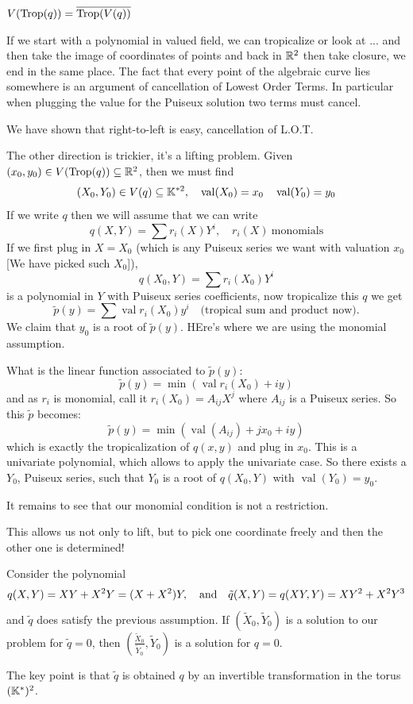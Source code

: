 \documentclass[12pt]{memoir}
\DeclareMathOperator{\val}{val}
\DeclareMathOperator{\Trop}{Trop}
\begin{document}
\begin{Th}
$V(\Trop(q))=\ov{\Trop(V(q))}$
\end{Th}

If we start with a polynomial in valued field, we can tropicalize or look at ... and then take the image of coordinates of points and back in $\mathbb{R}^2$ then take closure, we end in the same place. The fact that every point of the algebraic curve  lies somewhere is an argument of cancellation of Lowest Order Terms. In particular when plugging the value for the Puiseux solution two terms must cancel. 
\begin{ptcbp}
We have shown that right-to-left is easy, cancellation of L.O.T.\par 
The other direction is trickier, it's a lifting problem. Given $(x_0,y_0)\in V(\Trop(q))\subseteq\bR^2$, then we must find 
$$(X_0,Y_0)\in V(q)\subseteq \bK^{\ast2},\quad\val(X_0)=x_0\quad\val(Y_0)=y_0$$
If we write $q$ then we will assume that we can write 
$$q(X,Y)=\sum r_i(X)Y^i,\quad r_i(X)\ \text{monomials}$$
If we first plug in $X=X_0$ (which is any Puiseux series we want with valuation $x_0$ [We have picked such $X_0$]), 
$$q(X_0,Y)=\sum r_i(X_0)Y^i$$
is a polynomial in $Y$ with Puiseux series coefficients, now tropicalize this $q$ we get 
$$\tilde{p}(y)=\sum\val r_i(X_0)y^i\quad\text{(tropical sum and product now)}.$$
We claim that $y_0$ is a root of $\tilde{p}(y)$. HEre's where we are using the monomial assumption.\par 
What is the linear function associated to $\tilde{p}(y)$:
$$\tilde{p}(y)=\min(\val r_i(X_0)+iy)$$
and as $r_i$ is monomial, call it $r_i(X_0)=A_{ij}X^j$ where $A_{ij}$ is a Puiseux series. So this $\tilde{p}$ becomes:
$$\tilde{p}(y)=\min(\val(A_{ij})+jx_0+iy)$$
which is exactly the tropicalization of $q(x,y)$ and plug in $x_0$. This is a univariate polynomial, which allows to apply the univariate case. So there exists a $Y_0$, Puiseux series, such that $Y_0$ is a root of $q(X_0,Y)$ with $\val(Y_0)=y_0$.\par 
It remains to see that our monomial condition is not a restriction. 
\end{ptcbp}

This allows us not only to lift, but to pick one coordinate freely and then the other one is determined!

\begin{Ex}
    Consider the polynomial 
    $$q(X,Y)=XY+X^2Y=(X+X^2)Y,\quad\text{and}\quad\tilde{q}(X,Y)=q(XY,Y)=XY^2+X^2Y^3$$
    and $\tilde{q}$ does satisfy the previous assumption. If $(\tilde{X}_0,\tilde Y_0)$ is a solution to our problem for $\tilde{q}=0$, then $\left(\frac{\tilde{X}_0}{\tilde Y_0},\tilde Y_0\right)$ is a solution for $q=0$.\par 
    The key point is that $\tilde q$ is obtained $q$ by an invertible transformation in the torus $(\mathbb{K}^\ast)^2$.
\end{Ex}
\end{document}
